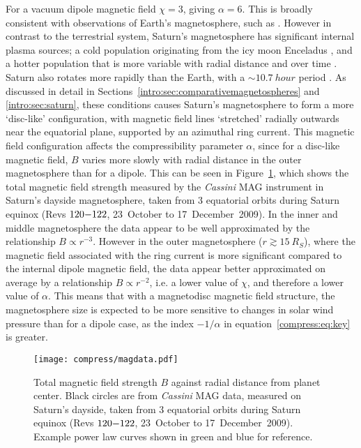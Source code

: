 For a vacuum dipole magnetic field $\chi=3$, giving $\alpha=6$. This is broadly consistent with observations of Earth's magnetosphere, such as \citet{shue1997}. However in contrast to the terrestrial system, Saturn's magnetosphere has significant internal plasma sources; a cold population originating from the icy moon Enceladus \citep[e.g.][]{dougherty2006,tokar2006}, and a hotter population that is more variable with radial distance and over time \citep[e.g.][]{sergis2009}. Saturn also rotates more rapidly  than the Earth, with a ${\sim}\SI{10.7}{hour}$ period \citep{desch1981}. As discussed in detail in Sections~\ref{intro:sec:comparativemagnetospheres} and \ref{intro:sec:saturn}, these conditions causes Saturn's magnetosphere to form a more `disc-like' configuration, with magnetic field lines `stretched' radially outwards near the equatorial plane, supported by an azimuthal ring current. This magnetic field configuration affects the compressibility parameter $\alpha$, since for a disc-like magnetic field, $B$ varies more slowly with radial distance in the outer magnetosphere than for a dipole. This can be seen in Figure~\ref{compress:fig:magdata}, which shows the total magnetic field strength measured by the \textit{Cassini} MAG instrument in Saturn's dayside magnetosphere, taken from 3 equatorial orbits during Saturn equinox (Revs $120{\--}122$, 23~October to 17~December~2009). In the inner and middle magnetosphere the data appear to be well approximated by the relationship $B \propto r^{-3}$. However in the outer magnetosphere ($r \gtrsim \SI{15}{R_S}$), where the magnetic field associated with the ring current is more significant compared to the internal dipole magnetic field, the data appear better approximated on average by a relationship $B \propto r^{-2}$, i.e. a lower value of $\chi$, and therefore a lower value of $\alpha$. This means that with a magnetodisc magnetic field structure, the magnetosphere size is expected to be more sensitive to changes in solar wind pressure than for a dipole case, as the index $-1/\alpha$ in equation~\ref{compress:eq:key} is greater.

\begin{figure}
\centering
\noindent\texttt{[image: compress/magdata.pdf]}
\caption[Equatorial magnetic field data from \textit{Cassini} MAG.]{Total magnetic field strength $B$ against radial distance from planet center. Black circles are from \textit{Cassini} MAG data, measured on Saturn's dayside, taken from 3 equatorial orbits during Saturn equinox (Revs $120{\--}122$, 23~October to 17~December~2009). Example power law curves shown in green and blue for reference.}
\label{compress:fig:magdata}
\end{figure}

